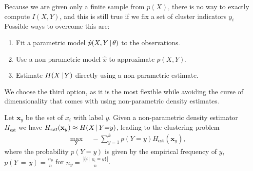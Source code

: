 Because we are given only a finite sample from $p(X)$, there is no way to
exactly compute $I(X, Y)$, and this is still true if we fix a set of cluster
indicators $y_i$ 
%
Possible ways to overcome this are:
\begin{enumerate}
    \item Fit a parametric model $\hat{p}(X, Y \, | \, \theta)$ to the observations.
    \item Use a non-parametric model $\hat{x}$ to approximate $p(X, Y)$. 
    \item Estimate $H(X \, | \, Y)$ directly using a non-parametric estimate.
\end{enumerate}
We choose the third option, as it is the most flexible while avoiding
the curse of dimensionality that comes with using non-parametric density estimates.

Let $\mathbf{x}_y$ be the set of $x_i$ with label $y$. 
Given a non-parametric density estimator $H_\text{est}$
we have $H_{est}(\mathbf{x}_y) \approx H(X \, | \, Y {=} y)$, leading to the clustering problem
\begin{align}\label{general_objective}
     \max_{\mathbf{y}}\quad - \sum_{y=1}^k p(Y{=}y) H_\text{est}(\mathbf{x}_y),
\end{align}
where the probability $p(Y{=}y)$ is given by the empirical frequency of $y$, 
\mbox{$p(Y\,{=}\,y)= \frac{n_y}{n}$} for $n_y = \frac{|\{i \mid y_i = y \}|}{n}$.

